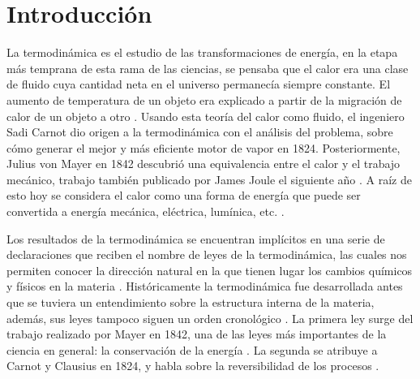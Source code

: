 
%


\newcommand{\keyword}[1]{\textit{#1}}


\section{Introducción}
	La termodinámica es el estudio de las transformaciones de energía, en la etapa más temprana de esta rama de las ciencias, se pensaba que el calor era una clase de fluido cuya cantidad neta en el universo permanecía siempre constante. El aumento de temperatura de un objeto era explicado a partir de la migración de calor de un objeto a otro \cite{feynman2011feynman, fermi1986}. Usando esta teoría del calor como fluido, el ingeniero Sadi Carnot dio origen a la termodinámica con el análisis del problema, sobre cómo generar el mejor y más eficiente motor de vapor en 1824. Posteriormente, Julius von Mayer en 1842 descubrió una equivalencia entre el calor y el trabajo mecánico, trabajo también publicado por James Joule el siguiente año \cite{fermi1986}. A raíz de esto hoy se considera el calor como una forma de energía que puede ser convertida a energía mecánica, eléctrica, lumínica, etc. \cite{fermi1986}.
	
	Los resultados de la termodinámica se encuentran implícitos en una serie de declaraciones que reciben el nombre de leyes de la termodinámica, las cuales nos permiten conocer la dirección natural en la que tienen lugar los cambios químicos y físicos en la materia \cite{atkins2011physical}. Históricamente la termodinámica fue desarrollada antes que se tuviera un entendimiento sobre la estructura interna de la materia, además, sus leyes tampoco siguen un orden cronológico \cite{feynman2011feynman}. La primera ley surge del trabajo realizado por Mayer en 1842, una de las leyes más importantes de la ciencia en general: la conservación de la energía \cite{feynman2011feynman, fermi1986}. La segunda se atribuye a Carnot y Clausius en 1824, y habla sobre la reversibilidad de los procesos \cite{feynman2011feynman}.
	
